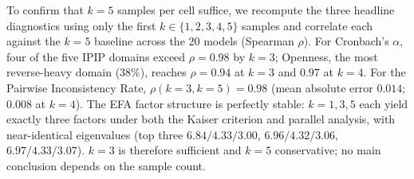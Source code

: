 \documentclass{article}
\begin{document}
To confirm that $k{=}5$ samples per cell suffice, we recompute the three headline diagnostics using only the first $k \in \{1,2,3,4,5\}$ samples and correlate each against the $k{=}5$ baseline across the 20 models (Spearman $\rho$). For Cronbach's $\alpha$, four of the five IPIP domains exceed $\rho{=}0.98$ by $k{=}3$; Openness, the most reverse-heavy domain ($38\%$), reaches $\rho{=}0.94$ at $k{=}3$ and $0.97$ at $k{=}4$. For the Pairwise Inconsistency Rate, $\rho(k{=}3,k{=}5)=0.98$ (mean absolute error $0.014$; $0.008$ at $k{=}4$). The EFA factor structure is perfectly stable: $k{=}1,3,5$ each yield exactly three factors under both the Kaiser criterion and parallel analysis, with near-identical eigenvalues (top three $6.84/4.33/3.00$, $6.96/4.32/3.06$, $6.97/4.33/3.07$). $k{=}3$ is therefore sufficient and $k{=}5$ conservative; no main conclusion depends on the sample count.
\end{document}
